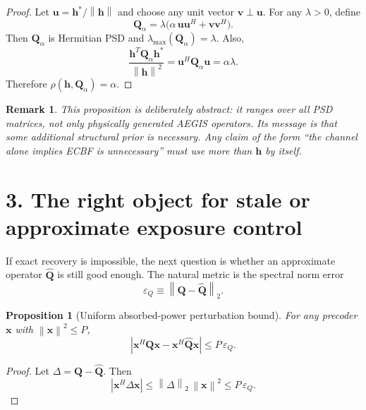 \documentclass[11pt]{article}
\newtheorem{proposition}{Proposition}
\newtheorem{remark}{Remark}
\newcommand{\hh}{\mathbf{h}}
\newcommand{\QQ}{\mathbf{Q}}
\newcommand{\x}{\mathbf{x}}
\newcommand{\norm}[1]{\left\lVert #1 \right\rVert}
\newcommand{\abs}[1]{\left\lvert #1 \right\rvert}
\begin{document}
\begin{proof}
Let $\mathbf{u}=\hh^*/\norm{\hh}$ and choose any unit vector
$\mathbf{v}\perp \mathbf{u}$. For any $\lambda>0$, define
\begin{equation}
  \QQ_\alpha
  = \lambda\bigl(\alpha\,\mathbf{u}\mathbf{u}^H
  + \mathbf{v}\mathbf{v}^H\bigr).
\end{equation}
Then $\QQ_\alpha$ is Hermitian PSD and
$\lambda_{\max}(\QQ_\alpha)=\lambda$. Also,
\begin{equation}
  \frac{\hh^T\QQ_\alpha\hh^*}{\norm{\hh}^2}
  = \mathbf{u}^H\QQ_\alpha\mathbf{u}
  = \alpha\lambda.
\end{equation}
Therefore $\rho(\hh,\QQ_\alpha)=\alpha$.
\end{proof}

\begin{remark}
This proposition is deliberately abstract: it ranges over all PSD matrices,
not only physically generated AEGIS operators. Its message is that
\emph{some additional structural prior is necessary}. Any claim of the form
``the channel alone implies ECBF is unnecessary'' must use more than
$\hh$ by itself.
\end{remark}

\section*{3. The right object for stale or approximate exposure control}

If exact recovery is impossible, the next question is whether an approximate
operator $\widehat{\QQ}$ is still good enough. The natural metric is the
spectral norm error
\begin{equation}
  \varepsilon_Q \equiv \norm{\QQ-\widehat{\QQ}}_2.
\end{equation}

\begin{proposition}[Uniform absorbed-power perturbation bound]
For any precoder $\x$ with $\norm{\x}^2 \le P$,
\begin{equation}
  \abs{\x^H\QQ\x - \x^H\widehat{\QQ}\x}
  \le P\,\varepsilon_Q.
\end{equation}
\end{proposition}

\begin{proof}
Let $\Delta=\QQ-\widehat{\QQ}$. Then
\begin{equation}
  \abs{\x^H\Delta\x}
  \le \norm{\Delta}_2\,\norm{\x}^2
  \le P\,\varepsilon_Q.
\end{equation}
\end{proof}
\end{document}
